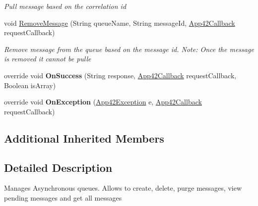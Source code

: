\begin{DoxyCompactItemize}
\begin{DoxyCompactList}\small\item\em Pull message based on the correlation id \end{DoxyCompactList}\item 
void \hyperlink{classcom_1_1shephertz_1_1app42_1_1paas_1_1sdk_1_1windows_1_1message_1_1_queue_service_a7f8ebc7db0d990de7444da56398a71da}{Remove\+Message} (String queue\+Name, String message\+Id, \hyperlink{interfacecom_1_1shephertz_1_1app42_1_1paas_1_1sdk_1_1windows_1_1_app42_callback}{App42\+Callback} request\+Callback)
\begin{DoxyCompactList}\small\item\em Remove message from the queue based on the message id. Note\+: Once the message is removed it cannot be pulle \end{DoxyCompactList}\item 
\hypertarget{classcom_1_1shephertz_1_1app42_1_1paas_1_1sdk_1_1windows_1_1message_1_1_queue_service_a5cf42ee0340f6eead7ffec7fb2fa35b7}{override void {\bfseries On\+Success} (String response, \hyperlink{interfacecom_1_1shephertz_1_1app42_1_1paas_1_1sdk_1_1windows_1_1_app42_callback}{App42\+Callback} request\+Callback, Boolean is\+Array)}\label{classcom_1_1shephertz_1_1app42_1_1paas_1_1sdk_1_1windows_1_1message_1_1_queue_service_a5cf42ee0340f6eead7ffec7fb2fa35b7}

\item 
\hypertarget{classcom_1_1shephertz_1_1app42_1_1paas_1_1sdk_1_1windows_1_1message_1_1_queue_service_acc7061af079e19676232a0fc0e961913}{override void {\bfseries On\+Exception} (\hyperlink{classcom_1_1shephertz_1_1app42_1_1paas_1_1sdk_1_1windows_1_1_app42_exception}{App42\+Exception} e, \hyperlink{interfacecom_1_1shephertz_1_1app42_1_1paas_1_1sdk_1_1windows_1_1_app42_callback}{App42\+Callback} request\+Callback)}\label{classcom_1_1shephertz_1_1app42_1_1paas_1_1sdk_1_1windows_1_1message_1_1_queue_service_acc7061af079e19676232a0fc0e961913}

\end{DoxyCompactItemize}
\subsection*{Additional Inherited Members}


\subsection{Detailed Description}
Manages Asynchronous queues. Allows to create, delete, purge messages, view pending messages and get all messages 

